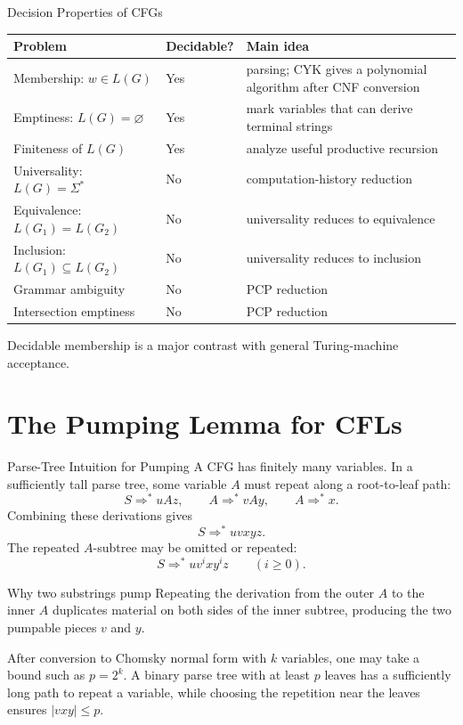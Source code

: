 \documentclass[10pt]{beamer}
\begin{document}
\begin{frame}{Decision Properties of CFGs}
  \small
  \begin{center}
  \begin{tabular}{L{4.1cm}L{2.0cm}L{4.1cm}}
    \toprule
    Problem & Decidable? & Main idea \\
    \midrule
    Membership: $w\in L(G)$ & Yes & parsing; CYK gives a polynomial algorithm after CNF conversion \\
    Emptiness: $L(G)=\varnothing$ & Yes & mark variables that can derive terminal strings \\
    Finiteness of $L(G)$ & Yes & analyze useful productive recursion \\
    Universality: $L(G)=\Sigma^*$ & No & computation-history reduction \\
    Equivalence: $L(G_1)=L(G_2)$ & No & universality reduces to equivalence \\
    Inclusion: $L(G_1)\subseteq L(G_2)$ & No & universality reduces to inclusion \\
    Grammar ambiguity & No & PCP reduction \\
    Intersection emptiness & No & PCP reduction \\
    \bottomrule
  \end{tabular}
  \end{center}
  Decidable membership is a major contrast with general Turing-machine acceptance.
\end{frame}

\section{The Pumping Lemma for CFLs}

\begin{frame}{Parse-Tree Intuition for Pumping}
  A CFG has finitely many variables. In a sufficiently tall parse tree, some variable $A$ must repeat
  along a root-to-leaf path:
  \[
    S\Rightarrow^*uAz,
    \qquad
    A\Rightarrow^*vAy,
    \qquad
    A\Rightarrow^*x.
  \]
  Combining these derivations gives
  \[
    S\Rightarrow^*uvxyz.
  \]
  The repeated $A$-subtree may be omitted or repeated:
  \[
    S\Rightarrow^*uv^ixy^iz
    \qquad(i\ge0).
  \]
  \begin{block}{Why two substrings pump}
    Repeating the derivation from the outer $A$ to the inner $A$ duplicates material on both sides
    of the inner subtree, producing the two pumpable pieces $v$ and $y$.
  \end{block}
  \footnotesize After conversion to Chomsky normal form with $k$ variables, one may take a bound such
  as $p=2^k$. A binary parse tree with at least $p$ leaves has a sufficiently long path to repeat a
  variable, while choosing the repetition near the leaves ensures $|vxy|\le p$.
\end{frame}
\end{document}
